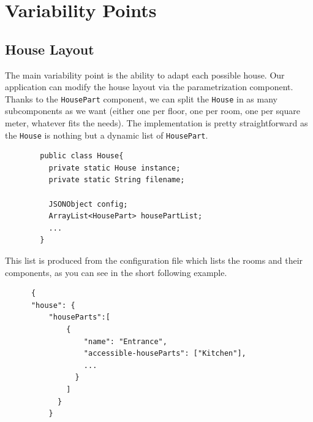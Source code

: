   \section{Variability Points}
    \subsection{House Layout}
      The main variability point is the ability to adapt each possible house. Our application can modify the house layout via the parametrization component. Thanks to the \texttt{HousePart} component, we can split the \texttt{House} in as many subcomponents as we want (either one per floor, one per room, one per square meter, whatever fits the needs). The implementation is pretty straightforward as the \texttt{House} is nothing but a dynamic list of \texttt{HousePart}.
      \begin{verbatim}
        public class House{
          private static House instance;
          private static String filename;

          JSONObject config;
          ArrayList<HousePart> housePartList;
          ...
        }
      \end{verbatim}
      This list is produced from the configuration file which lists the rooms and their components, as you can see in the short following example.
      \begin{verbatim}
      {
      "house": {
          "houseParts":[
              {
                  "name": "Entrance",
                  "accessible-houseParts": ["Kitchen"],
                  ...
                }
              ]
            }
          }
      \end{verbatim}


